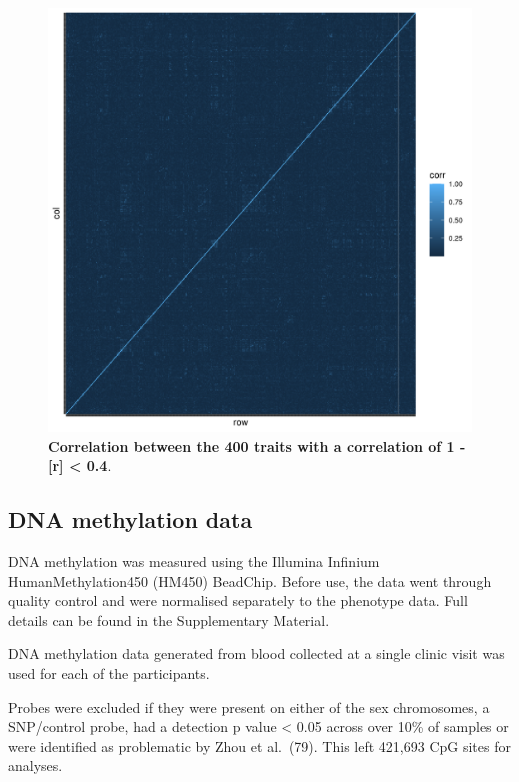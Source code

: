 \documentclass[11pt,oneside]{bristolthesis}
\begin{document}
\begin{figure}

{\centering \includegraphics[width=1\linewidth]{figure/05-h2ewas/test_correlation_plot} 

}

\caption[Correlation between the 400 traits with a correlation of 1 - {[}r{]} \textless{} 0.4]{\textbf{Correlation between the 400 traits with a correlation of 1 - {[}r{]} \textless{} 0.4}.}\label{fig:h2ewas-pheno-corr-subset}
\end{figure}
\hypertarget{dna-methylation-data-05}{%
\subsection{DNA methylation data}\label{dna-methylation-data-05}}

DNA methylation was measured using the Illumina Infinium HumanMethylation450 (HM450) BeadChip. Before use, the data went through quality control and were normalised separately to the phenotype data. Full details can be found in the Supplementary Material.

DNA methylation data generated from blood collected at a single clinic visit was used for each of the participants.

Probes were excluded if they were present on either of the sex chromosomes, a SNP/control probe, had a detection p value \textless{} 0.05 across over 10\% of samples or were identified as problematic by Zhou et al.~(79). This left 421,693 CpG sites for analyses.
\end{document}

